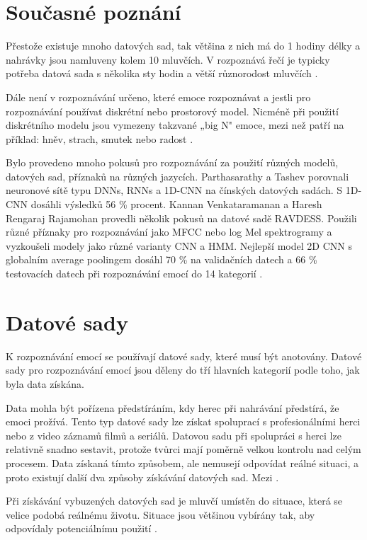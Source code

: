 \documentclass[FM,BP]{tulthesis}
\begin{document}
\section{Současné poznání}
Přestože existuje mnoho datových sad, tak většina z nich má do 1 hodiny délky a nahrávky jsou namluveny kolem 10 mluvčích. V rozpoznává řečí je typicky potřeba datová sada s několika sty hodin a větší různorodost mluvčích \cite{konar_chakraborty_2015}.

Dále není v rozpoznávání určeno, které emoce rozpoznávat a jestli pro rozpoznávání používat diskrétní nebo prostorový model. Nicméně při použití diskrétního modelu jsou vymezeny takzvané „big N" emoce, mezi než patří na příklad: hněv, strach, smutek nebo radost \cite{konar_chakraborty_2015}.

Bylo provedeno mnoho pokusů pro rozpoznávání za použití různých modelů, datových sad, příznaků na různých jazycích. Parthasarathy a
Tashev porovnali neuronové sítě typu DNNs, RNNs a 1D-CNN na čínských datových sadách. S 1D-CNN dosáhli výsledků 56 \% procent. Kannan Venkataramanan a Haresh Rengaraj Rajamohan provedli několik pokusů na datové sadě RAVDESS. Použili různé příznaky pro rozpoznávání jako MFCC nebo log Mel spektrogramy a vyzkoušeli modely jako různé varianty CNN a HMM. Nejlepší model 2D CNN s globalním average poolingem dosáhl 70 \% na validačních datech a 66 \% testovacích datech při rozpoznávání emocí do 14 kategorií \cite{DBLP:journals/corr/abs-1912-10458}.

\section{Datové sady} %
K rozpoznávání emocí se používají datové sady, které musí být anotovány. Datové sady pro rozpoznávání emocí jsou děleny do tří hlavních kategorií podle toho, jak byla data získána.

Data mohla být pořízena předstíráním, kdy herec při nahrávání předstírá, že emoci prožívá. Tento typ datové sady lze získat spoluprací s profesionálními herci nebo z video záznamů filmů a seriálů. Datovou sadu při spolupráci s herci lze relativně snadno sestavit, protože tvůrci mají poměrně velkou kontrolu nad celým procesem. Data získaná tímto způsobem, ale nemusejí odpovídat reálné situaci, a proto existují další dva způsoby získávání datových sad. Mezi  \cite{konar_chakraborty_2015}.

Při získávání vybuzených datových sad je mluvčí umístěn do situace, která se velice podobá reálnému životu. Situace jsou většinou vybírány tak, aby odpovídaly potenciálnímu použití \cite{konar_chakraborty_2015}.
\end{document}
